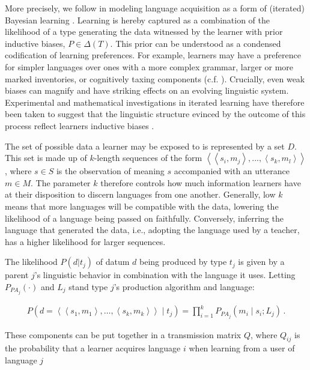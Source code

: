 \documentclass[10pt,a4paper]{article}
\newcommand{\tuple}[1]{\ensuremath{\left\langle #1 \right\rangle}}
\begin{document}
More precisely, we follow \citet{griffiths+kalish:2007} in modeling language acquisition as a form of (iterated) Bayesian learning \citep{griffiths+kalish:2007}. Learning is hereby captured as a combination of the likelihood of a type generating the data witnessed by the learner with prior inductive biases, $P \in \Delta(T)$. This prior can be understood as a condensed codification of learning preferences. For example, learners may have a preference for simpler languages over ones with a more complex grammar, larger or more marked inventories, or cognitively taxing components (c.f. \citealt{feldman:2000,chater+vitanyi:2003, kirby+etal:2015}). Crucially, even weak biases can magnify and have striking effects on an evolving linguistic system. Experimental and mathematical investigations in iterated learning have therefore been taken to suggest that the linguistic structure evinced by the outcome of this process reflect learners inductive biases \citep{kirby+etal:2007,kirby+etal:2014}. 

The set of possible data a learner may be exposed to is represented by a set $D$. This set is made up of $k$-length sequences of the form $\tuple{\tuple{s_i,m_j}, ..., \tuple{s_k,m_l}}$, where $s \in S$ is the observation of meaning $s$ accompanied with an utterance $m \in M$. The parameter $k$ therefore controls how much information learners have at their disposition to discern languages from one another. Generally, low $k$ means that more languages will be compatible with the data, lowering the likelihood of a language being passed on faithfully. Conversely, inferring the language that generated the data, i.e., adopting the language used by a teacher, has a higher likelihood for larger sequences. 


The likelihood $P(d|t_j)$ of datum $d$ being produced by type $t_j$ is given by a parent $j$'s linguistic behavior in combination with the language it uses. Letting $P_{PA_j}(\cdot)$ and $L_j$ stand type $j$'s production algorithm and language:

\begin{align*}
  P(d = \tuple{\tuple{s_1,m_1},\dots , \tuple{s_k,m_k}} \mid t_j) = \prod_{i = 1}^k P_{PA_j}(m_i
  \mid s_i; L_{j})\,.
\end{align*}



These components can be put together in a transmission matrix $Q$, where $Q_{ij}$ is the probability that a learner acquires language $i$ when learning from a user of language $j$
\end{document}
